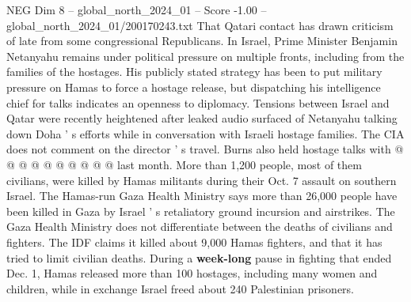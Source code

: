 \begin{textsample}{NEG Dim 8 – global\_north\_2024\_01 – Score -1.00 – global\_north\_2024\_01/200170243.txt}
That Qatari contact has drawn criticism of late from some congressional Republicans.
In Israel, Prime Minister Benjamin Netanyahu remains under political pressure on multiple fronts, including from the families of the hostages.
His publicly stated strategy has been to put military pressure on Hamas to force a hostage release, but dispatching his intelligence chief for talks indicates an openness to diplomacy.
Tensions between Israel and Qatar were recently heightened after leaked audio surfaced of Netanyahu talking down Doha ' s efforts while in conversation with Israeli hostage families.
The CIA does not comment on the director ' s travel.
Burns also held hostage talks with @ @ @ @ @ @ @ @ @ @ last month.
More than 1,200 people, most of them civilians, were killed by Hamas militants during their Oct. 7 assault on southern Israel.
The Hamas-run Gaza Health Ministry says more than 26,000 people have been killed in Gaza by Israel ' s retaliatory ground incursion and airstrikes.
The Gaza Health Ministry does not differentiate between the deaths of civilians and fighters.
The IDF claims it killed about 9,000 Hamas fighters, and that it has tried to limit civilian deaths.
During a \textbf{week-long} pause in fighting that ended Dec. 1, Hamas released more than 100 hostages, including many women and children, while in exchange Israel freed about 240 Palestinian prisoners.

\end{textsample}
